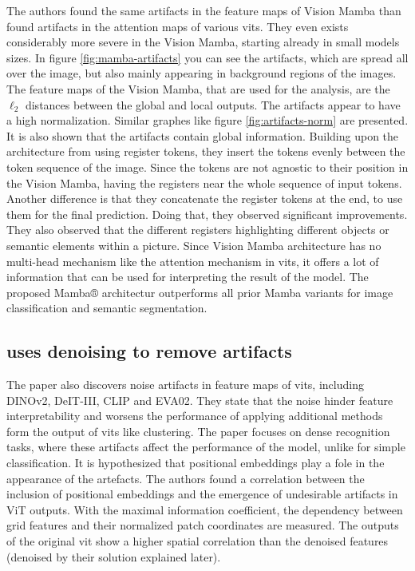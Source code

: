 \documentclass[conference]{IEEEtran}
\begin{document}
  The authors found the same artifacts in the feature maps of Vision Mamba than \citeauthor{registers} found artifacts in the attention maps of various \acp{vit}. They even exists considerably more severe in the Vision Mamba, starting already in small models sizes. In figure \ref{fig:mamba-artifacts} you can see the artifacts, which are spread all over the image, but also mainly appearing in background regions of the images. The feature maps of the Vision Mamba, that are used for the analysis, are the $\ell_2$ distances between the global and local outputs. The artifacts appear to have a high normalization. Similar graphes like figure \ref{fig:artifacts-norm} are presented. It is also shown that the artifacts contain global information. Building upon the architecture from \cite{registers} using register tokens, they insert the tokens evenly between the token sequence of the image. Since the tokens are not agnostic to their position in the Vision Mamba, having the registers near the whole sequence of input tokens. Another difference is that they concatenate the register tokens at the end, to use them for the final prediction. Doing that, they observed significant improvements. They also observed that the different registers highlighting different objects or semantic elements within a picture. Since Vision Mamba architecture has no multi-head mechanism like the attention mechanism in \acp{vit}, it offers a lot of information that can be used for interpreting the result of the model. The proposed Mamba® architectur outperforms all prior Mamba variants for image classification and semantic segmentation. \cite{mamba-needs-registers}


  \subsection{\cite{denoising} uses denoising to remove artifacts}
  The paper also discovers noise artifacts in feature maps of \acp{vit}, including \mbox{DINOv2}, DeIT-III, CLIP and EVA02. They state that the noise hinder feature interpretability and worsens the performance of applying additional methods form the output of \acp{vit} like clustering. The paper focuses on dense recognition tasks, where these artifacts affect the performance of the model, unlike for simple classification. It is hypothesized that positional embeddings play a fole in the appearance of the artefacts. The authors found a correlation between the inclusion of positional embeddings and the emergence of undesirable artifacts in ViT outputs. With the maximal information coefficient, the dependency between grid features and their normalized patch coordinates are measured. The outputs of the original \ac{vit} show a higher spatial correlation than the denoised features (denoised by their solution explained later).
  
\end{document}
